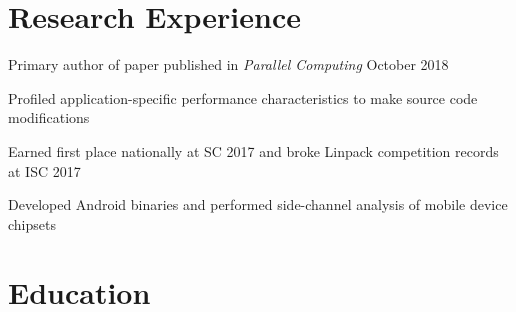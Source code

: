 \documentclass[]{resume-style}
\begin{document}
\vspace{-0.7mm}
\section{\hfill Research Experience \hfill}

\vspace{0.138mm}
\vspace{1.25mm}
\begin{tightemize}
\item Primary author of paper published in \textit{Parallel Computing} October 2018
\item Profiled application-specific performance characteristics to make source code modifications
\item Earned first place nationally at SC 2017 and broke Linpack competition records at ISC 2017
\end{tightemize}

\vspace{2mm}
\vspace{0.1mm}
\vspace{1.3mm}
\begin{tightemize}
\item Developed Android binaries and performed side-channel analysis of mobile device chipsets
\end{tightemize}
\vspace{-1mm}


\section{\hfill Education \hfill} 
\vspace{0.1mm}
 \\
\vspace{0.25mm}
\vspace{0.9mm}
\end{document}
